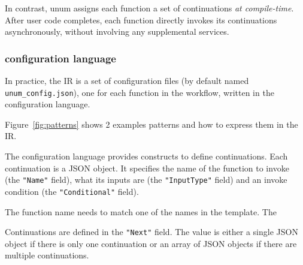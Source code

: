 In contrast, unum assigns each function a set of continuations \emph{at
compile-time}. After user code completes, each function directly invokes its
continuations asynchronously, without involving any supplemental services.





\subsubsection{\name{} configuration language}\label{sec:design-config-lang}

In practice, the \name{} IR is a set of configuration files (by default named
\texttt{unum\_config.json}), one for each function in the workflow, written in
the \name{} configuration language.

Figure~\ref{fig:patterns} shows 2 examples patterns and how to express them in
the \name{} IR.

The configuration language provides constructs to define continuations. Each
continuation is a JSON object. It specifies the name of the function to invoke
(the \texttt{"Name"} field), what its inputs are (the \texttt{"InputType"}
field) and an invoke condition (the \texttt{"Conditional"} field).

The function name needs to match one of the names in the \name{} template. The 

Continuations are defined in the \texttt{"Next"} field. The value is
either a single JSON object if there is only one continuation or an array
of JSON objects if there are multiple continuations.


